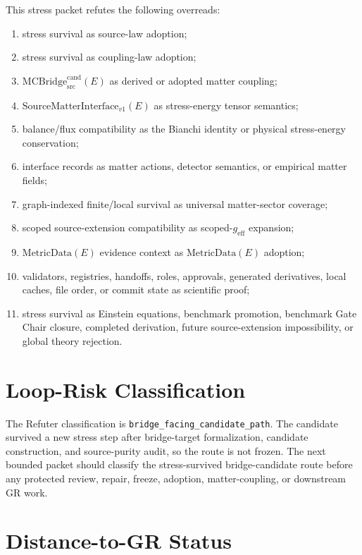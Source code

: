 \documentclass[11pt]{article}
\newcommand{\MetricData}{\mathrm{MetricData}}
\newcommand{\geff}{g_{\mathrm{eff}}}
\newcommand{\MCBridgeCand}{\mathrm{MCBridge}_{\mathrm{src}}^{\mathrm{cand}}}
\newcommand{\SMI}{\mathrm{SourceMatterInterface}_{v1}}
\begin{document}
This stress packet refutes the following overreads:
\begin{enumerate}[leftmargin=*]
  \item stress survival as source-law adoption;
  \item stress survival as coupling-law adoption;
  \item \(\MCBridgeCand(E)\) as derived or adopted matter coupling;
  \item \(\SMI(E)\) as stress-energy tensor semantics;
  \item balance/flux compatibility as the Bianchi identity or physical
  stress-energy conservation;
  \item interface records as matter actions, detector semantics, or empirical
  matter fields;
  \item graph-indexed finite/local survival as universal matter-sector
  coverage;
  \item scoped source-extension compatibility as scoped-\(\geff\) expansion;
  \item \(\MetricData(E)\) evidence context as \(\MetricData(E)\) adoption;
  \item validators, registries, handoffs, roles, approvals, generated
  derivatives, local caches, file order, or commit state as scientific proof;
  \item stress survival as Einstein equations, benchmark promotion, benchmark
  Gate Chair closure, completed derivation, future source-extension
  impossibility, or global theory rejection.
\end{enumerate}

\section{Loop-Risk Classification}

The Refuter classification is \texttt{bridge\_facing\_candidate\_path}. The
candidate survived a new stress step after bridge-target formalization,
candidate construction, and source-purity audit, so the route is not frozen.
The next bounded packet should classify the stress-survived bridge-candidate
route before any protected review, repair, freeze, adoption, matter-coupling,
or downstream GR work.

\section{Distance-to-GR Status}
\end{document}
